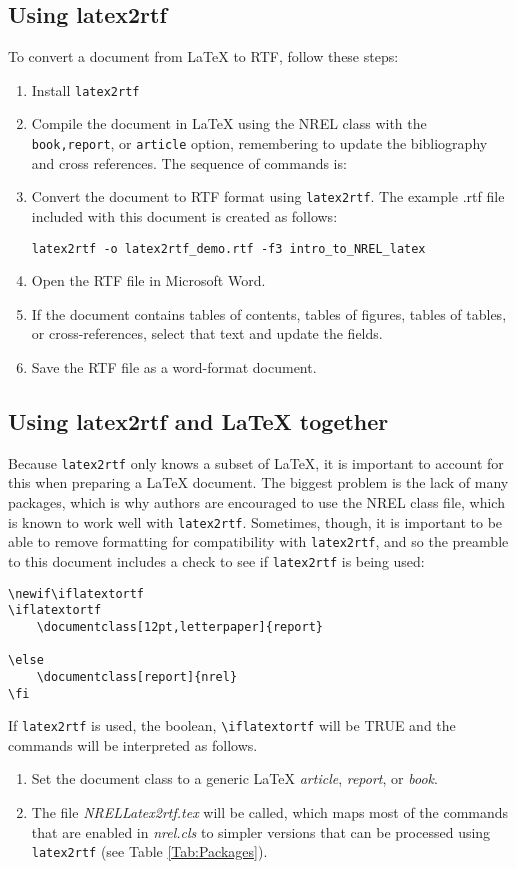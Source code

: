 \subsection{Using latex2rtf}
To convert a document from LaTeX to RTF, follow these steps:
\begin{enumerate}
\item Install \texttt{latex2rtf}
\item Compile the document in LaTeX using the NREL class with the \texttt{book,report}, or \texttt{article} option, remembering to update the bibliography and cross references. The sequence of commands is:
\item Convert the document to RTF format using \texttt{latex2rtf}. The example .rtf file included with this document is created as follows:
\begin{verbatim}
latex2rtf -o latex2rtf_demo.rtf -f3 intro_to_NREL_latex
\end{verbatim}
\item Open the RTF file in Microsoft Word.
\item If the document contains tables of contents, tables of figures, tables of tables, or cross-references, select that text and update the fields.
\item Save the RTF file as a word-format document.
\end{enumerate}

\subsection{Using latex2rtf and LaTeX together}
Because \texttt{latex2rtf} only knows a subset of LaTeX, it is important to account for this when preparing a LaTeX document. The biggest problem is the lack of many packages, which is why authors are encouraged to use the NREL class file, which is known to work well with \texttt{latex2rtf}. Sometimes, though, it is important to be able to remove formatting for compatibility with \texttt{latex2rtf}, and so the preamble to this document includes a check to see if \texttt{latex2rtf} is being used:

\begin{verbatim}
\newif\iflatextortf
\iflatextortf
	\documentclass[12pt,letterpaper]{report}
	
\else
	\documentclass[report]{nrel} 
\fi
\end{verbatim}

If \texttt{latex2rtf} is used, the boolean, \texttt{\textbackslash iflatextortf} will be TRUE and the commands will be interpreted as follows.
\begin{enumerate}
\item Set the document class to a generic LaTeX{} \emph{article}, \emph{report}, or \emph{book}. 
\item The file \emph{NRELLatex2rtf.tex} will be called, which maps most of the commands that are enabled in \emph{nrel.cls} to simpler versions that can be processed using \texttt{latex2rtf} (see Table \ref{Tab:Packages}).
\end{enumerate}

